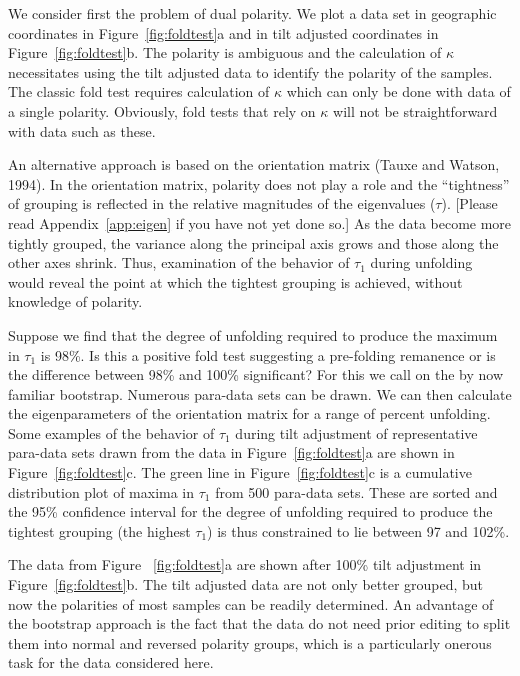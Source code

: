 We consider first the problem of dual polarity.  We plot a data 
set in geographic coordinates in Figure~\ref{fig:foldtest}a and in tilt adjusted coordinates in Figure~\ref{fig:foldtest}b.  The polarity is ambiguous and the
calculation of $\kappa$ necessitates
using the tilt adjusted  data to identify the polarity of the samples.
The classic fold test
requires calculation of $\kappa$ which can only be done with data of a single
polarity.  Obviously, fold tests that rely on $\kappa$ will not 
be straightforward with data such as these.

An alternative approach  is based on the orientation matrix 
(Tauxe and Watson, 1994).   \nocite{tauxe94}
 In the
orientation matrix, polarity does not  play a role and the ``tightness'' of
grouping is reflected in the relative magnitudes of the eigenvalues ($\tau$).  [Please read Appendix~\ref{app:eigen} if you have not yet done so.]
As the data become more tightly grouped, the variance along the principal
axis grows and those along the other axes shrink. Thus, examination of the
behavior of $\tau_1$ during unfolding would reveal the point at which
the tightest grouping is achieved, without knowledge of polarity.    



Suppose we find that the degree of unfolding required to
produce the maximum in $\tau_1$ is 98\%.  Is this a positive fold test
suggesting a pre-folding remanence or is the difference between 98\% and
100\% significant?  For this we call on the by now familiar bootstrap.  
Numerous para-data sets  can be drawn. We can then calculate the 
eigenparameters of the orientation matrix
for a range of  percent unfolding.  Some
examples of the behavior of $\tau_1$ during tilt adjustment of representative
para-data sets drawn from the data
in Figure~\ref{fig:foldtest}a are shown 
in Figure~\ref{fig:foldtest}c.  The green line in Figure~\ref{fig:foldtest}c is a cumulative distribution plot of maxima in
$\tau_1$ from 500 para-data sets.  These are sorted   and the 95\%
confidence interval for the degree of unfolding required to produce the
tightest grouping (the highest $\tau_1$)
 is  thus constrained to lie between 97 and 102\%.  



The data from Figure ~\ref{fig:foldtest}a are shown after 100\% tilt
adjustment
in Figure~\ref{fig:foldtest}b. The tilt adjusted
  data are not only better grouped, but now
the polarities of most samples can be readily determined.  An advantage 
of the bootstrap
approach is the fact that the data do not need prior editing to
split them into normal and reversed polarity groups, which is  a particularly onerous task
for the data considered here.

